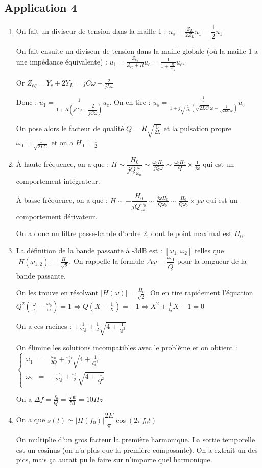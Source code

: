 \documentclass[a4paper,12pt]{book}
\begin{document}
\subsection{Application 4}
\begin{enumerate}
\item On fait un diviseur de tension dans la maille 1 : $u_s = \frac{Z_L}{2Z_L}u_1 = \dfrac{1}{2}u_1$
\par On fait ensuite un diviseur de tension dans la maille globale (où la maille 1 a une impédance équivalente) : $u_1 = \frac{Z_{eq}}{Z_{eq}+R}u_e=\frac{1}{1+\frac{R}{Z_{eq}}}u_e$.
\par Or $Z_{eq}=Y_c+2Y_L=jC\omega+\frac{2}{jL\omega}$
\par Donc : $u_1 = \frac{1}{1+R(jC\omega+\dfrac{2}{jC\omega})}u_e$. On en tire : $u_s =\frac{\frac{1}{2}}{1+j\sqrt{\frac{C}{2L}}(\sqrt{2LC}\omega-\frac{1}{\sqrt{2LC}\omega})}u_e$
\par On pose alors le facteur de qualité $Q=R\sqrt{\frac{C}{2L}}$ et la pulsation propre $\omega_0=\frac{1}{\sqrt{2LC}}$ et on a $H_0=\frac{1}{2}$
\item À haute fréquence, on a que : $H\sim \dfrac{H_0}{jQ\frac{\omega}{\omega_0}} \sim \frac{\omega_0H_0}{jQ\omega}\sim \frac{\omega_0H_0}{Q}\times\frac{1}{j\omega}$ qui est un comportement intégrateur.
\par À basse fréquence, on a que : $H\sim -\dfrac{H_0}{jQ\frac{\omega_0}{\omega}}\sim \frac{j\omega H_0}{Q\omega_0}\sim \frac{H_0}{Q\omega_0}\times j\omega$ qui est un comportement dérivateur.
\par On a donc un filtre passe-bande d'ordre 2, dont le point maximal est $H_0$.
\item La définition de la bande passante à -3dB est : $[\omega_1,\omega_2]$ telles que $\vert H(\omega_{1,2})\vert = \frac{H_0}{\sqrt{2}}$. On rappelle la formule $\Delta\omega=\dfrac{\omega_0}{Q}$ pour la longueur de la bande passante.
\par On les trouve en résolvant $\vert H(\omega)\vert = \frac{H_0}{\sqrt{2}}$. On en tire rapidement l'équation $Q^2(\frac{\omega}{\omega_0}-\frac{\omega_0}{\omega})=1 \Leftrightarrow Q(X-\frac{1}{X})=\pm 1\Leftrightarrow X^2\pm\frac{1}{Q}X-1=0$
\par On a ces racines : $\pm\frac{1}{2Q}\pm\frac{1}{2}\sqrt{4+\frac{1}{Q^2}}$
\par On élimine les solutions incompatibles avec le problème et on obtient :$\left\{\begin{array}{rcl} \omega_1 & = & \frac{\omega_0}{2Q}+\frac{\omega_0}{2}\sqrt{4+\frac{1}{Q^2}} \\ \omega_2 & = & -\frac{\omega_0}{2Q}+\frac{\omega_0}{2}\sqrt{4+\frac{1}{Q^2}} \end{array}\right.$
\par On a $\Delta f = \frac{f_0}{Q}=\frac{500}{50}=10Hz$
\item On a que $s(t)\simeq \vert H(f_0)\vert \dfrac{2E}{\pi}\cos(2\pi f_0t)$
\par On multiplie d'un gros facteur la première harmonique. La sortie temporelle est un cosinus (on n'a plus que la première composante). On a extrait un des pics, mais ça aurait pu le faire sur n'importe quel harmonique. 
\end{enumerate}
\end{document}
